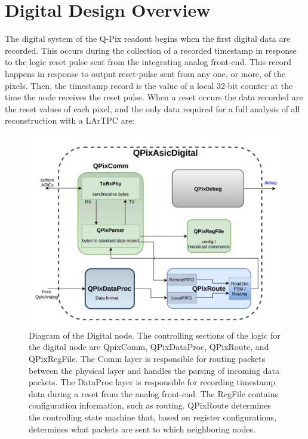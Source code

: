 \section{Digital Design Overview}

The digital system of the Q-Pix readout begins when the first digital data are recorded.
This occurs during the collection of a recorded timestamp in response to the logic reset pulse sent from the integrating analog front-end.
This record happens in response to output reset-pulse sent from any one, or more, of the pixels.
Then, the timestamp record is the value of a local 32-bit counter at the time the node receives the reset pulse.
When a reset occurs the data recorded are the reset values of each pixel, and the only data required for a full analysis of all reconstruction with a LArTPC are:

\begin{figure}[]
\centering
\includegraphics[width=\textwidth]{images/digital_node_overview.jpg}
\caption{Diagram of the Digital node.
  The controlling sections of the logic for the digital node are QpixComm, QPixDataProc, QPixRoute, and QPixRegFile.
  The Comm layer is responsible for routing packets between the physical layer and handles the parsing of incoming data packets.
  The DataProc layer is responsible for recording timestamp data during a reset from the analog front-end.
  The RegFile contains configuration information, such as routing.
  QPixRoute determines the controlling state machine that, based on register configurations, determines what packets are sent to which neighboring nodes.}
\end{figure}~\label{fig:qpa_diagram}

